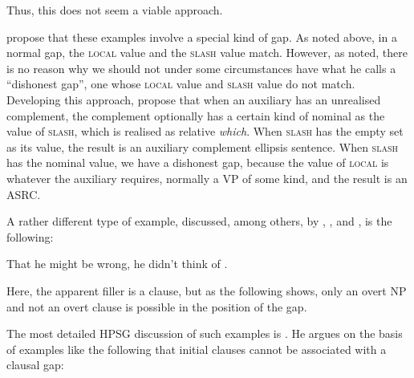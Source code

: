 \documentclass[output=paper
	        ,collection
	        ,collectionchapter
 	        ,biblatex
                ,babelshorthands
                ,newtxmath
                ,draftmode
                ,colorlinks, citecolor=brown
]{langscibook}
\begin{document}
{\begin{exe}
\begin{xlist}
\end{xlist}
\end{exe}

\noindent
Thus, this does not seem a viable approach.

\citet{Arnold:Borsley:10} propose that these examples involve a special
kind of gap. As noted above, in a normal gap, the \textsc{local} value and the
\textsc{slash} value match. However, as \citet{webelhuth08} noted, there is no
reason why we should not under some circumstances have what he calls a
``dishonest gap'', one whose \textsc{local} value and \textsc{slash} value do not match.
Developing this approach, \citet{Arnold:Borsley:10} propose that when an
auxiliary has an unrealised complement, the complement optionally has a
certain kind of nominal as the value of \textsc{slash}, which is realised as
relative \emph{which}. When \textsc{slash} has the empty set as its value, the
result is an auxiliary complement ellipsis sentence. When \textsc{slash} has the
nominal value, we have a dishonest gap, because the value of \textsc{local} is
whatever the auxiliary requires, normally a VP of some kind, and the
result is an ASRC.

A rather different type of example, discussed, among others, by
\citet{Bresnan01}, \citet{Bouma:Malouf:Sag:01}, and \citet{Webelhuth:12},
is the following:

\begin{exe}
\ex  \label{ex:UDC:ThatHeMightBeWrong}  That he might be wrong, he didn't think of \trace{}.
\end{exe}

\noindent
Here, the apparent filler is a clause, but as the following shows, only
an overt NP and not an overt clause is possible in the position of the
gap.

\begin{exe}
\ex
\begin{xlist}
\end{xlist}
\end{exe}

\noindent
The most detailed HPSG discussion of such examples is \citet{Webelhuth:12}.
He argues on the basis of examples like the following that initial
clauses cannot be associated with a clausal gap:

\begin{exe} \ex \begin{xlist} 
\end{xlist}
\end{exe}

}
\end{document}
